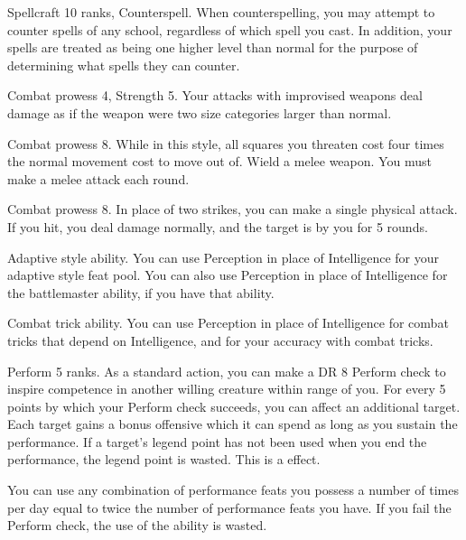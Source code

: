 \featpres Spellcraft 10 ranks, Counterspell.
\featben When counterspelling, you may attempt to counter spells of any school, regardless of which spell you cast.
In addition, your spells are treated as being one higher level than normal for the purpose of determining what spells they can counter.

\featpres Combat prowess 4, Strength 5.
\featben Your attacks with improvised weapons deal damage as if the weapon were two size categories larger than normal.

\featpre Combat prowess 8.
\featben While in this style, all squares you threaten cost four times the normal movement cost to move out of.
\stylereq Wield a melee weapon.
You must make a melee attack each round.

\featpre Combat prowess 8.
\featben In place of two strikes, you can make a single physical attack.
If you hit, you deal damage normally, and the target is \taunted by you for 5 rounds.

\featpre Adaptive style ability.
\featben You can use Perception in place of Intelligence for your adaptive style feat pool.
You can also use Perception in place of Intelligence for the battlemaster ability, if you have that ability.

\featpre Combat trick ability.
\featben You can use Perception in place of Intelligence for combat tricks that depend on Intelligence, and for your accuracy with combat tricks.

\featpre Perform 5 ranks.
\featben As a standard action, you can make a DR 8 Perform check to inspire competence in another willing creature within \rngmed range of you.
For every 5 points by which your Perform check succeeds, you can affect an additional target.
Each target gains a bonus offensive  which it can spend as long as you sustain the performance.
If a target's legend point has not been used when you end the performance, the legend point is wasted.
This is a  effect.

 You can use any combination of performance feats you possess a number of times per day equal to twice the number of performance feats you have.
If you fail the Perform check, the use of the ability is wasted.

